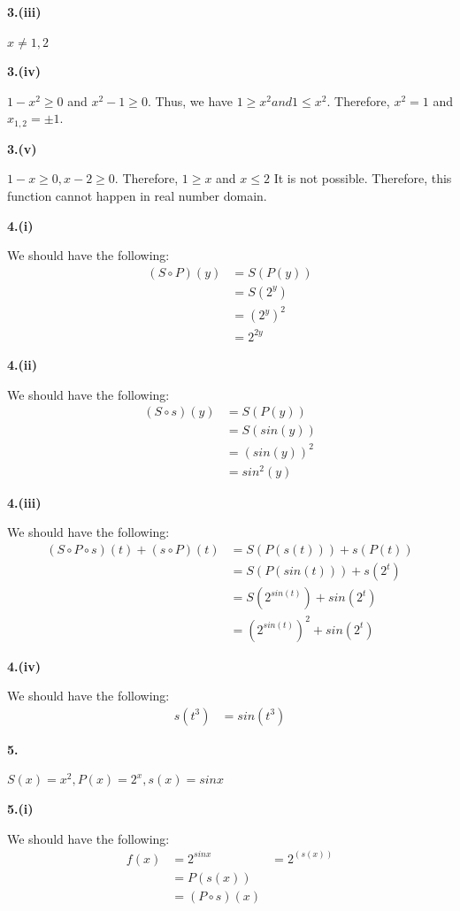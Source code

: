 \documentclass[a4paper,12pt]{report}
\begin{document}
\noindent
\textbf{3.(iii)}

\noindent
$x\neq1,2$

\noindent
\textbf{3.(iv)}

\noindent
$1-x^2\geq 0$ and $x^2-1\geq 0$. Thus, we have $1\geq x^2 and 1\leq x^2$. Therefore, $x^2=1$ and $x_{1,2}=\pm 1$. 

\noindent
\textbf{3.(v)}

\noindent
$1-x\geq 0, x-2\geq 0$. Therefore, $1\geq x$ and $x\leq 2$ It is not possible. Therefore, this function cannot happen in real number domain. 

\noindent
\textbf{4.(i)}

\noindent
We should have the following:
\begin{align*}
(S\circ P)(y)
&=S(P(y))\\
&=S(2^y)\\
&=(2^y)^2\\
&=2^{2y}
\end{align*}

\noindent
\textbf{4.(ii)}

\noindent
We should have the following:
\begin{align*}
(S\circ s)(y)
&=S(P(y))\\
&=S(sin(y))\\
&=(sin(y))^2\\
&=sin^2(y)
\end{align*}

\noindent
\textbf{4.(iii)}

\noindent
We should have the following:
\begin{align*}
(S\circ P\circ s)(t)+(s\circ P)(t)
&=S(P(s(t)))+s(P(t))\\
&=S(P(sin(t))) + s(2^t)\\
&=S(2^{sin(t)})+sin(2^t)\\
&=(2^{sin(t)})^2+sin(2^t)
\end{align*}

\noindent
\textbf{4.(iv)}

\noindent
We should have the following:
\begin{align*}
s(t^3)
&=sin(t^3)
\end{align*}

\noindent
\textbf{5.}

\noindent
$S(x)=x^2,P(x)=2^x,s(x)=sinx$

\noindent
\textbf{5.(i)}

\noindent
We should have the following:
\begin{align*}
f(x)&=2^{sinx}
&=2^(s(x))\\
&=P(s(x))\\
&=(P\circ s)(x)
\end{align*}
\end{document}
